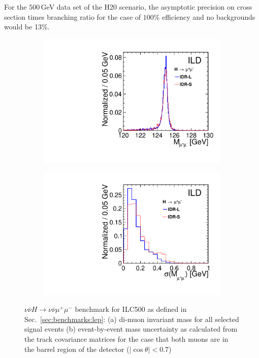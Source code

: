 For the $500$\,GeV data set of the H20 scenario, the asymptotic precision on cross section times branching ratio for the case of $100\%$ efficiency and no backgrounds would be 13\%.  
\begin{figure}[htbp]
\begin{subfigure}{0.49\hsize}  
\includegraphics[width=\textwidth]{Performance/fig/mumu_mass.pdf}
\caption{ \label{fig:Hmumu:mass}}
 \end{subfigure}
\begin{subfigure}{0.49\hsize}  \includegraphics[width=\textwidth]{Performance/fig/sigma_mumu_mass_07.pdf}
 \caption{  \label{fig:Hmumu:sigma}}
 \end{subfigure}
\caption{$\nu\bar{\nu} H \to \nu\bar{\nu} \mu^+\mu^-$ benchmark for ILC500 as defined in Sec.~\ref{sec:benchmarks:lep}:
(a) di-muon invariant mass for all selected signal events
(b) event-by-event mass uncertainty as calculated from the track covariance matrices for the case that both muons are in the barrel region of the detector ($|\cos{\theta}| < 0.7$)
}
\label{fig:Hmumu}
\end{figure}

